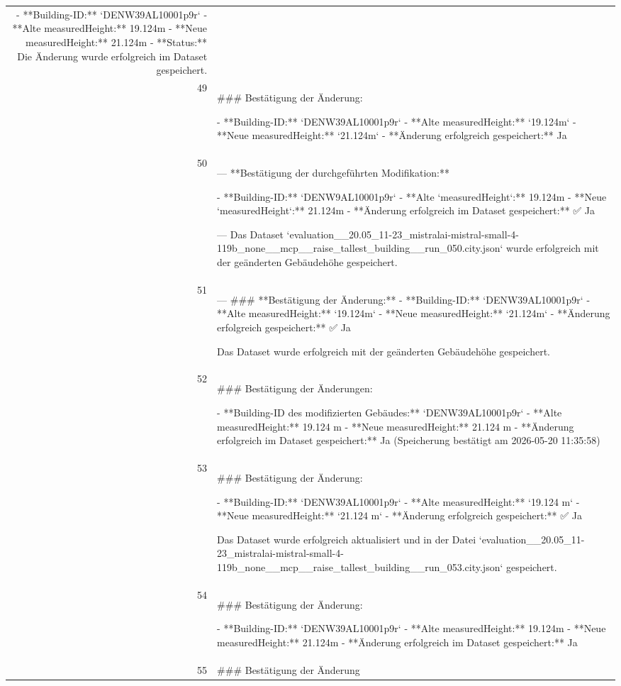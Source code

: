 \documentclass[a4paper,11pt]{article}
\begin{document}
\begin{table}[ht]
\begin{tabular}{r p{12cm}}
- **Building-ID:** `DENW39AL10001p9r`
- **Alte measuredHeight:** 19.124m
- **Neue measuredHeight:** 21.124m
- **Status:** Die Änderung wurde erfolgreich im Dataset gespeichert. \\
49 & \#\#\# Bestätigung der Änderung:

- **Building-ID:** `DENW39AL10001p9r`
- **Alte measuredHeight:** `19.124m`
- **Neue measuredHeight:** `21.124m`
- **Änderung erfolgreich gespeichert:** Ja \\
50 & ---
**Bestätigung der durchgeführten Modifikation:**

- **Building-ID:** `DENW9AL10001p9r`
- **Alte `measuredHeight`:** 19.124m
- **Neue `measuredHeight`:** 21.124m
- **Änderung erfolgreich im Dataset gespeichert:** ✅ Ja

---
Das Dataset `evaluation\_\_20.05\_11-23\_mistralai-mistral-small-4-119b\_none\_\_mcp\_\_raise\_tallest\_building\_\_run\_050.city.json` wurde erfolgreich mit der geänderten Gebäudehöhe gespeichert. \\
51 & ---
\#\#\# **Bestätigung der Änderung:**
- **Building-ID:** `DENW39AL10001p9r`
- **Alte measuredHeight:** `19.124m`
- **Neue measuredHeight:** `21.124m`
- **Änderung erfolgreich gespeichert:** ✅ Ja

Das Dataset wurde erfolgreich mit der geänderten Gebäudehöhe gespeichert. \\
52 & \#\#\# Bestätigung der Änderungen:

- **Building-ID des modifizierten Gebäudes:** `DENW39AL10001p9r`
- **Alte measuredHeight:** 19.124 m
- **Neue measuredHeight:** 21.124 m
- **Änderung erfolgreich im Dataset gespeichert:** Ja (Speicherung bestätigt am 2026-05-20 11:35:58) \\
53 & \#\#\# Bestätigung der Änderung:

- **Building-ID:** `DENW39AL10001p9r`
- **Alte measuredHeight:** `19.124 m`
- **Neue measuredHeight:** `21.124 m`
- **Änderung erfolgreich gespeichert:** ✅ Ja

Das Dataset wurde erfolgreich aktualisiert und in der Datei `evaluation\_\_20.05\_11-23\_mistralai-mistral-small-4-119b\_none\_\_mcp\_\_raise\_tallest\_building\_\_run\_053.city.json` gespeichert. \\
54 & \#\#\# Bestätigung der Änderung:

- **Building-ID:** `DENW39AL10001p9r`
- **Alte measuredHeight:** 19.124m
- **Neue measuredHeight:** 21.124m
- **Änderung erfolgreich im Dataset gespeichert:** Ja \\
55 & \#\#\# Bestätigung der Änderung


\end{tabular}
\end{table}
\end{document}
